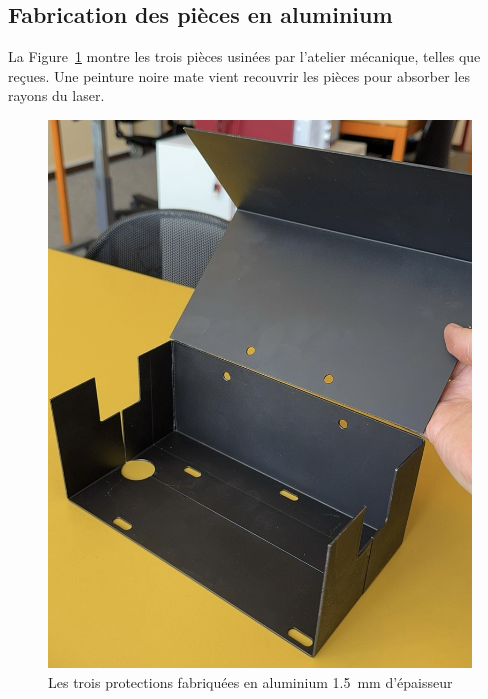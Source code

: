 \subsection{Fabrication des pièces en aluminium}
\begin{minipage}{\textwidth}

    \begin{minipage}[c]{0.6\textwidth}
        La Figure~\ref{capots_brutes} montre les trois pièces usinées par l'atelier mécanique, telles que reçues. Une peinture noire mate vient recouvrir les pièces pour absorber les rayons du laser.
    \end{minipage}\hfill
    \begin{minipage}[c]{0.35\textwidth}
        \begin{figure}[H]
            \centering
            \includegraphics[width=\textwidth]{assets/figures/Protections_laser/Securite_mecanique/Protection_entree_laser/capots_brutes.jpg}
            \caption{Les trois protections fabriquées en aluminium 1.5~mm d'épaisseur}
            \label{capots_brutes}
        \end{figure}
    \end{minipage}
\end{minipage}


